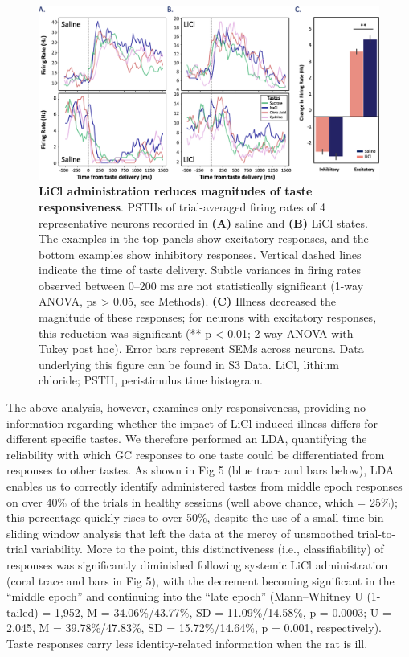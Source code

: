 \begin{refsection}
{\begin{figure}
\includegraphics[width=\linewidth]{stone_2022_figs/journal.pbio.3001537.g004.png} 
\caption{\textbf{LiCl administration reduces magnitudes of taste responsiveness}. PSTHs of trial-averaged firing rates of 4 representative neurons recorded in \textbf{(A)} saline and \textbf{(B)} LiCl states. The examples in the top panels show excitatory responses, and the bottom examples show inhibitory responses. Vertical dashed lines indicate the time of taste delivery. Subtle variances in firing rates observed between 0–200 ms are not statistically significant (1-way ANOVA, ps > 0.05, see Methods). \textbf{(C)} Illness decreased the magnitude of these responses; for neurons with excitatory responses, this reduction was significant (** p < 0.01; 2-way ANOVA with Tukey post hoc). Error bars represent SEMs across neurons. Data underlying this figure can be found in S3 Data. LiCl, lithium chloride; PSTH, peristimulus time histogram.
}
\label{fig:wrapfig}
\end{figure}


The above analysis, however, examines only responsiveness, providing no information regarding whether the impact of LiCl-induced illness differs for different specific tastes. We therefore performed an LDA, quantifying the reliability with which GC responses to one taste could be differentiated from responses to other tastes. As shown in Fig 5 (blue trace and bars below), LDA enables us to correctly identify administered tastes from middle epoch responses on over 40\% of the trials in healthy sessions (well above chance, which = 25\%); this percentage quickly rises to over 50\%, despite the use of a small time bin sliding window analysis that left the data at the mercy of unsmoothed trial-to-trial variability. More to the point, this distinctiveness (i.e., classifiability) of responses was significantly diminished following systemic LiCl administration (coral trace and bars in Fig 5), with the decrement becoming significant in the “middle epoch” and continuing into the “late epoch” (Mann–Whitney U (1-tailed) = 1,952, M = 34.06\%/43.77\%, SD = 11.09\%/14.58\%, p = 0.0003; U = 2,045, M = 39.78\%/47.83\%, SD = 15.72\%/14.64\%, p = 0.001, respectively). Taste responses carry less identity-related information when the rat is ill.

}
\end{refsection}
